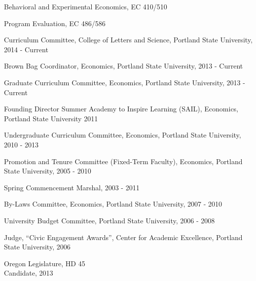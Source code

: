 \documentclass[Computer Science]{vita}
\begin{document}
\begin{vita}
\begin{Instructional Activities}
\begin{Courses}
    \item Behavioral and Experimental Economics, EC 410/510
    \item Program Evaluation, EC 486/586
    \end{Courses}

      
  \end{Instructional Activities}
  \begin{Professional and Service Activities}

    \begin{University}
    
    \item Curriculum Committee, College of Letters and Science, Portland State University, 2014 - Current
    
    \item Brown Bag Coordinator, Economics, Portland State University, 2013 - Current
    
    \item Graduate Curriculum Committee, Economics, Portland State University, 2013 - Current

\item Founding Director Summer Academy to Inspire Learning (SAIL), Economics, Portland State University 2011

    \item Undergraduate Curriculum Committee, Economics, Portland
      State University, 2010 - 2013

    \item Promotion and Tenure Committee (Fixed-Term Faculty),
      Economics, Portland State University, 2005 - 2010

    \item Spring Commencement Marshal, 2003 - 2011
  
    \item By-Laws Committee, Economics, Portland State University,
      2007 - 2010

    \item University Budget Committee, Portland State University, 2006
      - 2008

    \item Judge, ``Civic Engagement Awards'', Center for Academic
      Excellence, Portland State University, 2006

    \end{University}

    \begin{Community}
\item Oregon Legislature, HD 45\\ Candidate, 2013


\end{Community}
\end{Professional and Service Activities}
\end{vita}
\end{document}
